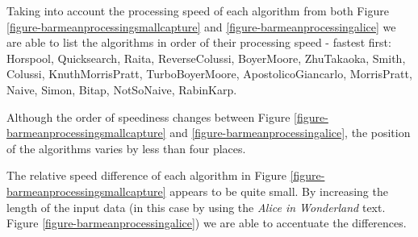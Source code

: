\documentclass[11pt]{article}
\begin{document}
Taking into account the processing speed of each algorithm from both Figure \ref{figure-barmeanprocessingsmallcapture} and \ref{figure-barmeanprocessingalice} we are able to list the algorithms in order of their processing speed - fastest first: Horspool, Quicksearch, Raita, ReverseColussi, BoyerMoore, ZhuTakaoka, Smith, Colussi, KnuthMorrisPratt, TurboBoyerMoore, ApostolicoGiancarlo, MorrisPratt, Naive, Simon, Bitap, NotSoNaive, RabinKarp. 

Although the order of speediness changes between Figure \ref{figure-barmeanprocessingsmallcapture} and \ref{figure-barmeanprocessingalice}, the position of the algorithms varies by less than four places.

The relative speed difference of each algorithm in Figure \ref{figure-barmeanprocessingsmallcapture} appears to be quite small. By increasing the length of the input data (in this case by using the \textit{Alice in Wonderland} text. Figure \ref{figure-barmeanprocessingalice}) we are able to accentuate the differences. 
\end{document}
